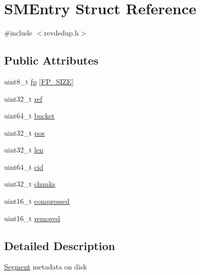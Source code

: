 \hypertarget{structSMEntry}{\section{\-S\-M\-Entry \-Struct \-Reference}
\label{structSMEntry}
}


{\ttfamily \#include $<$revdedup.\-h$>$}

\subsection*{\-Public \-Attributes}
\begin{DoxyCompactItemize}
\item 
uint8\-\_\-t \hyperlink{structSMEntry_a55d95205751f86e15965f042fcb80cde}{fp} \mbox{[}\hyperlink{revdedup_8h_a5147a30bb976e44355fd0559f9d10abe}{\-F\-P\-\_\-\-S\-I\-Z\-E}\mbox{]}
\item 
uint32\-\_\-t \hyperlink{structSMEntry_a924dca451023f2e5397765e59510b077}{ref}
\item 
uint64\-\_\-t \hyperlink{structSMEntry_a3386ef7f82301b6fa487f77e69a09c80}{bucket}
\item 
uint32\-\_\-t \hyperlink{structSMEntry_a07ad56746a45bda3fd1398f4dfb0b71b}{pos}
\item 
uint32\-\_\-t \hyperlink{structSMEntry_a00e9a58c206ca0f7c7e048e0dee79e88}{len}
\item 
uint64\-\_\-t \hyperlink{structSMEntry_ac7c9d44ce3264841482906e372b42986}{cid}
\item 
uint32\-\_\-t \hyperlink{structSMEntry_af3eac3fc8f226023f2f0cbe376ce181f}{chunks}
\item 
uint16\-\_\-t \hyperlink{structSMEntry_ad3fc577e518cee72b47bd09dc2b58530}{compressed}
\item 
uint16\-\_\-t \hyperlink{structSMEntry_a9c29e41b9d1bc3578c61e5d749a4877a}{removed}
\end{DoxyCompactItemize}


\subsection{\-Detailed \-Description}
\hyperlink{structSegment}{\-Segment} metadata on disk 

